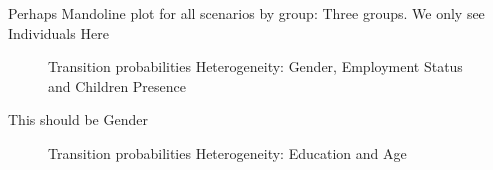 \documentclass[
  11pt,
]{article}
\begin{document}
Perhaps Mandoline plot for all scenarios by group: Three groups. We only
see Individuals Here

\begin{figure}[H]


\caption{\label{fig-tran_by_group1}Transition probabilities
Heterogeneity: Gender, Employment Status and Children Presence}

\end{figure}%

This should be Gender

\begin{figure}[H]


\caption{\label{fig-tran_by_group2}Transition probabilities
Heterogeneity: Education and Age}

\end{figure}%
\end{document}
